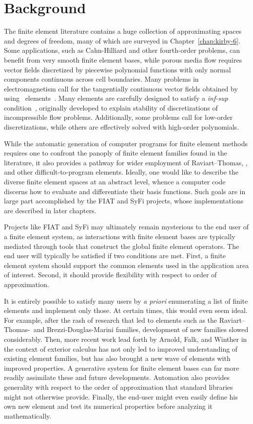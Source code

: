\section{Background}
The finite element literature contains a huge collection of
approximating spaces and degrees of freedom, many of which are
surveyed in Chapter~\ref{chap:kirby-6}.
Some applications, such as Cahn-Hilliard and
other fourth-order problems, can benefit from very smooth finite
element bases,  while porous media flow requires
vector fields discretized by piecewise polynomial functions with
only normal components continuous across cell boundaries.  Many problems in
electromagnetism call for the tangentially continuous vector fields obtained
by using \nedelec\ elements~\citep{Nedelec1980,Nedelec1986}.  Many elements are carefully designed
to satisfy a \emph{inf-sup} condition~\citep{BrezziFortin1991,GiraultRaviart1986},
originally developed to explain stability of discretizations of
incompressible flow problems.  Additionally, some problems call for low-order
discretizations, while others are effectively solved with high-order
polynomials.

While the automatic generation of computer programs for finite element
methods requires one to confront the panoply of  finite
element families found in the literature, it also provides a pathway
for wider employment of Raviart--Thomas, \nedelec, and other
difficult-to-program elements.
Ideally, one would like to
describe the diverse finite element spaces at an abstract level,
whence a computer code discerns how to evaluate and differentiate
their basis functions.  Such goals are in large part accomplished by
the FIAT and SyFi projects, whose implementations are described in
later chapters.

Projects like FIAT and SyFi may ultimately remain
mysterious to the end user of a
finite element system, as
interactions with finite element bases are typically mediated through
tools that construct the global finite element operators.
The end user will typically be satisfied if two conditions are met.
First, a finite element system
should support the common elements used in the application
area of interest.  Second, it should provide flexibility with respect
to order of approximation.

It is entirely possible to satisfy many users by \emph{a priori}
enumerating a list of finite elements and implement only those.  At certain times, this
would even seem ideal.  For example, after the rash of research
that led to elements such as the Raviart--Thomas-\nedelec\ and
Brezzi-Douglas-Marini families, development of new families slowed
considerably.  Then, more recent work lead forth by  Arnold, Falk, and Winther in the context of exterior
calculus has not only led to
improved understanding of existing element families, but has also
brought a new wave of elements with improved properties.  A
generative system for finite element bases can far more
readily assimilate these and future developments.
Automation also provides generality with respect to the order of approximation that standard libraries
might not otherwise provide. Finally, the end-user might even easily define his own new element
and test its numerical properties before analyzing it mathematically.



